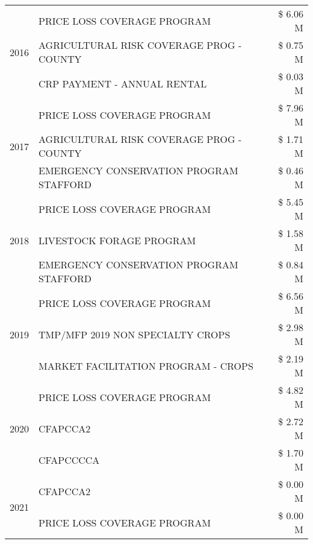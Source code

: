 \begin{tabular}{llr}
\cline{1-3}
\multirow[t]{3}{*}{2016} & PRICE LOSS COVERAGE PROGRAM                   & \$ 6.06 M \\
 & AGRICULTURAL RISK COVERAGE PROG - COUNTY      & \$ 0.75 M \\
 & CRP PAYMENT - ANNUAL RENTAL                   & \$ 0.03 M \\
\cline{1-3}
\multirow[t]{3}{*}{2017} & PRICE LOSS COVERAGE PROGRAM & \$ 7.96 M \\
 & AGRICULTURAL RISK COVERAGE PROG - COUNTY & \$ 1.71 M \\
 & EMERGENCY CONSERVATION PROGRAM STAFFORD & \$ 0.46 M \\
\cline{1-3}
\multirow[t]{3}{*}{2018} & PRICE LOSS COVERAGE PROGRAM & \$ 5.45 M \\
 & LIVESTOCK FORAGE PROGRAM & \$ 1.58 M \\
 & EMERGENCY CONSERVATION PROGRAM STAFFORD & \$ 0.84 M \\
\cline{1-3}
\multirow[t]{3}{*}{2019} & PRICE LOSS COVERAGE PROGRAM & \$ 6.56 M \\
 & TMP/MFP 2019 NON SPECIALTY CROPS & \$ 2.98 M \\
 & MARKET FACILITATION PROGRAM - CROPS & \$ 2.19 M \\
\cline{1-3}
\multirow[t]{3}{*}{2020} & PRICE LOSS COVERAGE PROGRAM & \$ 4.82 M \\
 & CFAPCCA2 & \$ 2.72 M \\
 & CFAPCCCCA & \$ 1.70 M \\
\cline{1-3}
\multirow[t]{2}{*}{2021} & CFAPCCA2 & \$ 0.00 M \\
 & PRICE LOSS COVERAGE PROGRAM & \$ 0.00 M \\
\cline{1-3}
\bottomrule
\end{tabular}
